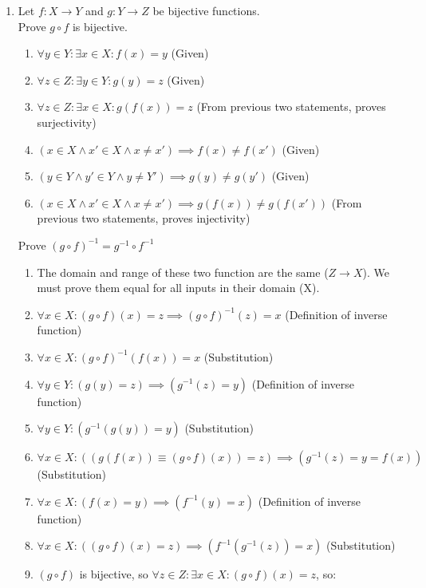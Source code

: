 \documentclass{article}
\begin{document}
\begin{enumerate}
        \item Let $f: X \rightarrow Y$ and $g: Y \rightarrow Z$ be bijective functions. \\
            Prove $g \circ f$ is bijective.
            \begin{enumerate}
                \item $\forall y \in Y: \exists x \in X: f(x) = y$ (Given)
                \item $\forall z \in Z: \exists y \in Y: g(y) = z$ (Given)
                \item $\forall z \in Z: \exists x \in X: g(f(x)) = z$ (From previous two statements, proves surjectivity)
                \item $(x \in X \land x' \in X \land x \neq x') \implies f(x) \neq f(x')$ (Given)
                \item $(y \in Y \land y' \in Y \land y \neq Y') \implies g(y) \neq g(y')$ (Given)
                \item $(x \in X \land x' \in X \land x \neq x') \implies g(f(x)) \neq g(f(x'))$ (From previous two statements, proves injectivity)
            \end{enumerate}
            Prove ${(g \circ f)}^{-1} = g^{-1} \circ f^{-1}$
            \begin{enumerate}
                \item The domain and range of these two function are the same ($Z \rightarrow X$). We must prove them equal for all inputs in their domain (X).
                \item $\forall x \in X: (g \circ f)(x) = z \implies {(g \circ f)}^{-1}(z) = x$ (Definition of inverse function)
                \item $\forall x \in X: {(g \circ f)}^{-1}(f(x)) = x$ (Substitution)
                \item $\forall y \in Y: (g(y) = z) \implies (g^{-1}(z) = y)$ (Definition of inverse function)
                \item $\forall y \in Y: (g^{-1}(g(y)) = y)$ (Substitution)
                \item $\forall x \in X: ((g(f(x)) \equiv (g \circ f)(x)) = z) \implies (g^{-1}(z) = y = f(x))$ (Substitution)
                \item $\forall x \in X: (f(x) = y) \implies (f^{-1}(y) = x)$ (Definition of inverse function)
                \item $\forall x \in X: ((g \circ f)(x) = z) \implies (f^{-1}(g^{-1}(z)) = x)$ (Substitution)
                \item $(g \circ f)$ is bijective, so $\forall z \in Z: \exists x \in X: (g \circ f)(x) = z$, so:

\end{enumerate}
\end{enumerate}
\end{document}
